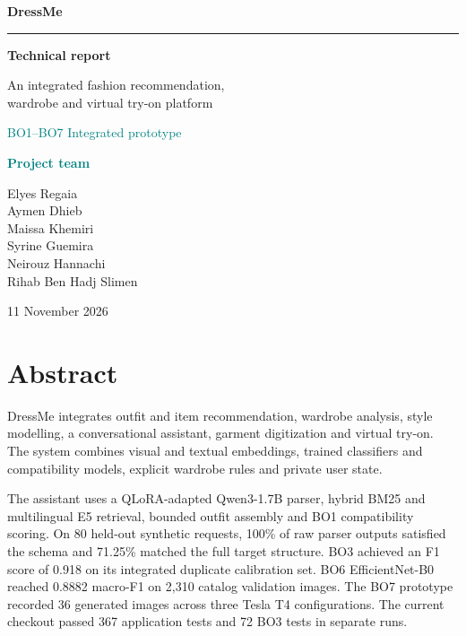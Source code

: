 \documentclass[11pt,a4paper]{article}
\begin{document}
\begin{titlepage}
\color{ink}
\vspace*{17mm}
{\Large\bfseries DressMe\par}
\vspace{7mm}
{\color{teal}\rule{\linewidth}{1.7pt}}\par
\vspace{19mm}
{\Huge\bfseries Technical report\par}
\vspace{6mm}
{\Large An integrated fashion recommendation,\\ wardrobe and virtual try-on platform\par}
\vspace{15mm}
{\large\textcolor{teal}{BO1--BO7 \enspace\textbar\enspace Integrated prototype}}\par
\vspace{15mm}
{\small\bfseries\textcolor{teal}{Project team}\par}
{\large
Elyes Regaia\\
Aymen Dhieb\\
Maissa Khemiri\\
Syrine Guemira\\
Neirouz Hannachi\\
Rihab Ben Hadj Slimen\par}
\vfill
{\large 11 November 2026\par}
\end{titlepage}

\section*{Abstract}
DressMe integrates outfit and item recommendation, wardrobe analysis, style modelling, a conversational assistant, garment digitization and virtual try-on. The system combines visual and textual embeddings, trained classifiers and compatibility models, explicit wardrobe rules and private user state.

The assistant uses a QLoRA-adapted Qwen3-1.7B parser, hybrid BM25 and multilingual E5 retrieval, bounded outfit assembly and BO1 compatibility scoring. On 80 held-out synthetic requests, 100\% of raw parser outputs satisfied the schema and 71.25\% matched the full target structure. BO3 achieved an F1 score of 0.918 on its integrated duplicate calibration set. BO6 EfficientNet-B0 reached 0.8882 macro-F1 on 2,310 catalog validation images. The BO7 prototype recorded 36 generated images across three Tesla T4 configurations. The current checkout passed 367 application tests and 72 BO3 tests in separate runs.
\end{document}
